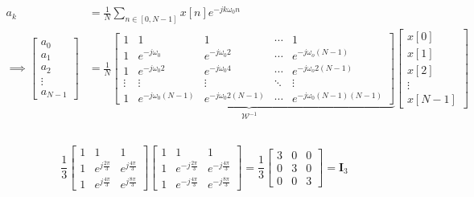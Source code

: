 \documentclass{article}
\begin{document}
\begin{align}
    a_k &= \frac{1}{N} \sum_{n \in [0, N - 1]} x[n] e^{-j k \omega_0 n} \\
    \implies
    \begin{bmatrix}
        a_0 \\
        a_1 \\
        a_2 \\
        \vdots \\
        a_{N - 1}    
    \end{bmatrix}
    &=
    \underbrace{\frac{1}{N} \begin{bmatrix}
        1 & 1 & 1 & \cdots & 1 \\
        1 & e^{-j \omega_0} & e^{-j \omega_0 2} & \cdots & e^{-j \omega_o (N - 1)} \\
        1 & e^{-j \omega_0 2} & e^{-j \omega_0 4} & \cdots & e^{-j \omega_o 2(N - 1)} \\
        \vdots & \vdots & \vdots & \ddots & \vdots \\
        1 & e^{-j \omega_0 (N - 1)} & e^{-j \omega_0 2(N - 1)} & \cdots & e^{-j \omega_0 (N - 1) (N - 1)}
    \end{bmatrix}}_{\mathcal{W}^{-1}}
    \begin{bmatrix}
        x[0] \\
        x[1] \\
        x[2] \\
        \vdots \\
        x[N - 1]
    \end{bmatrix}
\end{align}

\subsection{}

\begin{equation}
    \frac{1}{3}
    \begin{bmatrix}
        1 & 1 & 1 \\
        1 & e^{j \frac{2\pi}{3}} & e^{j \frac{4\pi}{3}} \\
        1 & e^{j \frac{4\pi}{3}} & e^{j \frac{8\pi}{3}}
    \end{bmatrix}
    \begin{bmatrix}
        1 & 1 & 1 \\
        1 & e^{-j \frac{2\pi}{3}} & e^{-j \frac{4\pi}{3}} \\
        1 & e^{-j \frac{4\pi}{3}} & e^{-j \frac{8\pi}{3}}
    \end{bmatrix}
    =
    \frac{1}{3} \begin{bmatrix}
        3 & 0 & 0 \\
        0 & 3 & 0 \\
        0 & 0 & 3
    \end{bmatrix} = \bm{I}_3
\end{equation}
\end{document}
